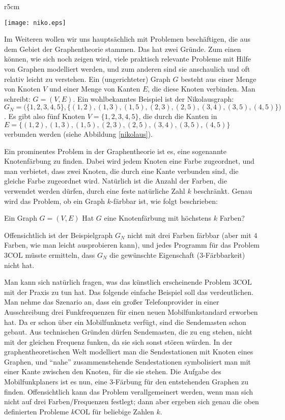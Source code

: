 \begin{wrapfigure}[14]{r}{5cm}
\centerline{\texttt{[image: niko.eps]}}
\caption{Der Graph $G_N$}
\label{nikolaus} 
\end{wrapfigure}
Im Weiteren wollen wir uns hauptsächlich mit Problemen beschäftigen,
die aus dem Gebiet der Graphentheorie stammen.  Das hat zwei
Gründe. Zum einen können, wie sich noch zeigen wird, viele praktisch
relevante Probleme mit Hilfe von Graphen modelliert werden, und zum
anderen sind sie anschaulich und oft relativ leicht zu verstehen.  Ein
(ungerichteter) Graph $G$ besteht aus einer Menge von Knoten $V$ und
einer Menge von Kanten $E$, die diese Knoten verbinden. Man schreibt:
$G=(V,E)$. Ein wohlbekanntes Beispiel ist der Nikolausgraph:
$G_N=\bigl(\{1,2,3,4,5\},\allowbreak\{(1,2),\allowbreak(1,3),\allowbreak
(1,5),\allowbreak(2,3),\allowbreak(2,5),\allowbreak(3,4),\allowbreak
(3,5),\allowbreak(4,5)\}\bigr)$.  Es gibt also fünf Knoten
$V=\{1,2,3,4,5\}$, die durch die Kanten in
$E=\{(1,2),\allowbreak(1,3),\allowbreak(1,5),\allowbreak(2,3),\allowbreak
(2,5),\allowbreak(3,4),\allowbreak(3,5),\allowbreak(4,5)\}$ verbunden
werden (siehe Abbildung \ref{nikolaus}).


Ein prominentes Problem in der Graphentheorie ist es, eine sogenannte
Knotenfärbung zu finden. Dabei wird jedem Knoten eine Farbe
zugeordnet, und man verbietet, dass zwei Knoten, die durch eine Kante
verbunden sind, die gleiche Farbe zugeordnet wird. Natürlich ist die
Anzahl der Farben, die verwendet werden dürfen, durch eine feste
natürliche Zahl $k$ beschränkt. Genau wird das Problem, ob ein Graph
$k$-färbbar ist, wie folgt beschrieben:

{Ein Graph $G=(V,E)$}
{Hat $G$ eine Knotenfärbung mit höchstens $k$ Farben?}

Offensichtlich ist der Beispielgraph $G_N$ nicht mit drei Farben färbbar
(aber mit $4$ Farben, wie man leicht ausprobieren kann), und jedes
Programm für das Problem $3\mathrm{COL}$ müsste ermitteln, dass $G_N$ die
gewünschte Eigenschaft ($3$-Färbbarkeit) nicht hat.

Man kann sich natürlich fragen, was das künstlich erscheinende
Problem $3\mathrm{COL}$ mit der Praxis zu tun hat. Das folgende einfache
Beispiel soll das verdeutlichen. Man nehme das Szenario an, dass
ein großer Telefonprovider in einer Ausschreibung drei
Funkfrequenzen für einen neuen Mobilfunkstandard erworben hat. Da er
schon über ein Mobilfunknetz verfügt, sind die Sendemasten schon
gebaut. Aus technischen Gründen dürfen Sendemasten, die zu eng stehen,
nicht mit der gleichen Frequenz funken, da sie sich sonst stören
würden. In der graphentheoretischen Welt modelliert man die
Sendestationen mit Knoten eines Graphen, und "`nahe"' zusammenstehende
Sendestationen symbolisiert man mit einer Kante zwischen den Knoten,
für die sie stehen. Die Aufgabe des Mobilfunkplaners ist es nun, eine
$3$-Färbung für den entstehenden Graphen zu finden. Offensichtlich
kann das Problem verallgemeinert werden, wenn man sich nicht auf drei
Farben/Frequenzen festlegt; dann aber ergeben sich genau die oben
definierten Probleme $k\mathrm{COL}$ für beliebige Zahlen $k$.

